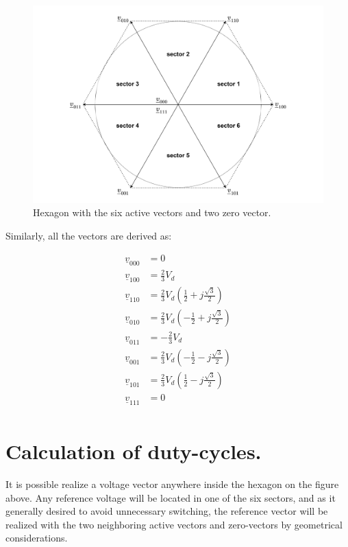 \documentclass[]{book}
\begin{document}
\begin{figure}
\includegraphics[width=1\linewidth]{images/modulation/hexagon} \caption{Hexagon with the six active vectors and two zero vector.}\label{fig:unnamed-chunk-1}
\end{figure}

Similarly, all the vectors are derived as:

\[
\begin{aligned}
\underline{v}_{000} &  = 0\\
\underline{v}_{100} &  = \frac{2}{3} V_d\\
\underline{v}_{110} &  = \frac{2}{3} V_d (\frac{1}{2}+j\frac{\sqrt{3}}{2})\\
\underline{v}_{010} &  = \frac{2}{3} V_d (-\frac{1}{2}+j\frac{\sqrt{3}}{2})\\
\underline{v}_{011} &  = -\frac{2}{3} V_d\\
\underline{v}_{001} &  = \frac{2}{3} V_d (-\frac{1}{2}-j\frac{\sqrt{3}}{2})\\
\underline{v}_{101} &  = \frac{2}{3} V_d (\frac{1}{2}-j\frac{\sqrt{3}}{2})\\
\underline{v}_{111} &  = 0\\
\end{aligned}
\]

\hypertarget{calculation-of-duty-cycles.}{%
\section{Calculation of duty-cycles.}\label{calculation-of-duty-cycles.}}

It is possible realize a voltage vector anywhere inside the hexagon on the figure above. Any reference voltage will be located in one of the six sectors, and as it generally desired to avoid unnecessary switching, the reference vector will be realized with the two neighboring active vectors and zero-vectors by geometrical considerations.
\end{document}
